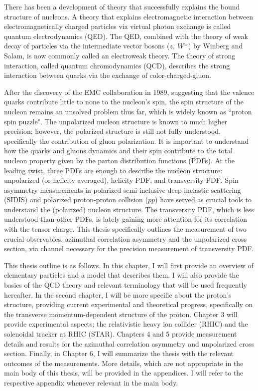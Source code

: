 There has been a development of theory that successfully explains the bound structure of nucleons. A theory that explains electromagnetic interaction between electromagnetically charged particles via virtual photon exchange is called quantum electrodynamics (QED). The QED, combined with the theory of weak decay of particles via the intermediate vector bosons ($z,\ W^\pm $) by Winberg and Salam, is now commonly called an electroweak theory. The theory of strong interaction, called quantum chromodynamics (QCD), describes the strong interaction between quarks via the exchange of color-charged-gluon.   

After the discovery of the EMC collaboration in 1989, suggesting that the valence quarks contribute little to none to the nucleon's spin, the spin structure of the nucleon remains an unsolved problem thus far, which is widely known as ``proton spin puzzle". 
The unpolarized nucleon structure is known to much higher precision; however, the polarized structure is still not fully understood, specifically the contribution of gluon polarization. It is important to understand how the quarks and gluons dynamics and their spin contribute to the total nucleon property given by the parton distribution functions (PDFs). At the leading twist, three PDFs are enough to describe the nucleon structure: unpolarized (or helicity averaged), helicity PDF, and transversity PDF. Spin asymmetry measurements in polarized  semi-inclusive deep inelastic scattering  (SIDIS) and polarized proton-proton collision ($pp$) have served as crucial tools to understand the (polarized) nucleon structure. The transversity PDF, which is less understood than other PDFs, is lately gaining more attention for its correlation with the tensor charge. This thesis specifically outlines the measurement of two crucial observables, azimuthal correlation asymmetry and the unpolarized cross section, via \dipion channel necessary for the precision measurement of transversity PDF.    

This thesis outline is as follows. In this chapter, I will first provide an overview of elementary particles and a model that describes them. I will also provide the basics of the QCD theory and relevant terminology that will be used frequently hereafter. In the second chapter, I will be more specific about the proton's structure, providing current experimental and theoretical progress, specifically on the transverse momentum-dependent structure of the proton. Chapter 3 will provide experimental aspects; the relativistic heavy ion collider (RHIC) and the solenoidal tracker at RHIC (STAR). Chapters 4  and 5 provide measurement details and results for the  azimuthal correlation asymmetry and unpolarized \dipion cross section. Finally, in Chapter 6, I will summarize the thesis with the relevant outcomes of the measurements. More details, which are not appropriate in the main body of this thesis, will be provided in the appendices. I will refer to the respective appendix whenever relevant in the main body. 

